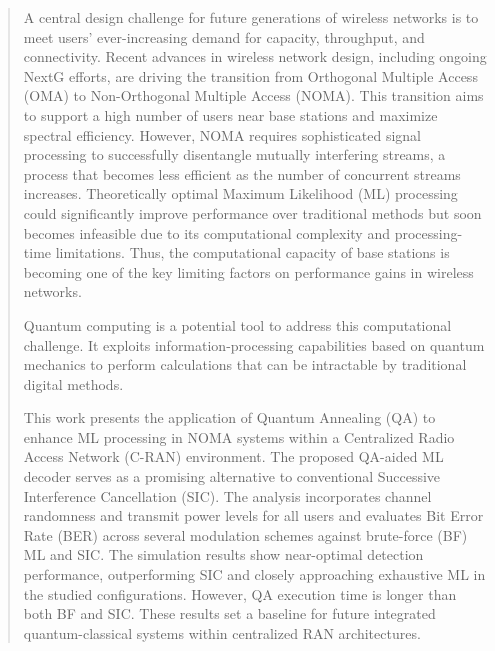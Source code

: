 \begin{abstract}
A central design challenge for future generations of wireless networks is to meet users' ever-increasing demand for capacity, throughput, and connectivity. Recent advances in wireless network design, including ongoing NextG efforts, are driving the transition from Orthogonal Multiple Access (OMA) to Non-Orthogonal Multiple Access (NOMA). This transition aims to support a high number of users near base stations and maximize spectral efficiency. However, NOMA requires sophisticated signal processing to successfully disentangle mutually interfering streams, a process that becomes less efficient as the number of concurrent streams increases. Theoretically optimal Maximum Likelihood (ML) processing could significantly improve performance over traditional methods but soon becomes infeasible due to its computational complexity and processing-time limitations. Thus, the computational capacity of base stations is becoming one of the key limiting factors on performance gains in wireless networks.

Quantum computing is a potential tool to address this computational challenge. It exploits information-processing capabilities based on quantum mechanics to perform calculations that can be intractable by traditional digital methods.

This work presents the application of Quantum Annealing (QA) to enhance ML processing in NOMA systems within a Centralized Radio Access Network (C-RAN) environment. The proposed QA-aided ML decoder serves as a promising alternative to conventional Successive Interference Cancellation (SIC). The analysis incorporates channel randomness and transmit power levels for all users and evaluates Bit Error Rate (BER) across several modulation schemes against brute-force (BF) ML and SIC. The simulation results show near-optimal detection performance, outperforming SIC and closely approaching exhaustive ML in the studied configurations. However, QA execution time is longer than both BF and SIC. These results set a baseline for future integrated quantum-classical systems within centralized RAN architectures.
\end{abstract}
